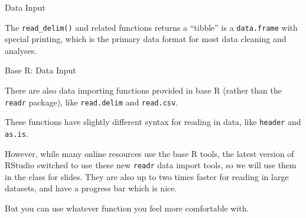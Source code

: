 \documentclass[
  ignorenonframetext,
]{beamer}
\begin{document}
\begin{frame}[fragile]{Data Input}
\protect\hypertarget{data-input-13}{}

The \texttt{read\_delim()} and related functions returns a ``tibble'' is
a \texttt{data.frame} with special printing, which is the primary data
format for most data cleaning and analyses.

\end{frame}

\begin{frame}[fragile]{Base R: Data Input}
\protect\hypertarget{base-r-data-input}{}

There are also data importing functions provided in base R (rather than
the \texttt{readr} package), like \texttt{read.delim} and
\texttt{read.csv}.

These functions have slightly different syntax for reading in data, like
\texttt{header} and \texttt{as.is}.

However, while many online resources use the base R tools, the latest
version of RStudio switched to use these new \texttt{readr} data import
tools, so we will use them in the class for slides. They are also up to
two times faster for reading in large datasets, and have a progress bar
which is nice.

But you can use whatever function you feel more comfortable with.

\end{frame}
\end{document}
